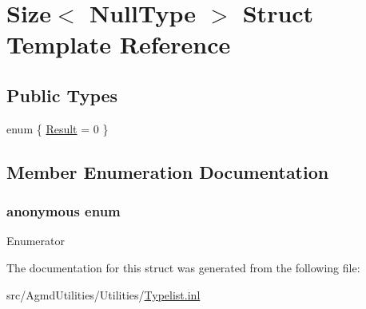 \hypertarget{struct_size_3_01_null_type_01_4}{\section{Size$<$ Null\+Type $>$ Struct Template Reference}
\label{struct_size_3_01_null_type_01_4}
}
\subsection*{Public Types}
\begin{DoxyCompactItemize}
\item 
enum \{ \hyperlink{struct_size_3_01_null_type_01_4_aeaa2268587cc37ed49ac6b9675227211a5bd5396c607e51f55bfcfcc2dc70995e}{Result} = 0
 \}
\end{DoxyCompactItemize}


\subsection{Member Enumeration Documentation}
\hypertarget{struct_size_3_01_null_type_01_4_aeaa2268587cc37ed49ac6b9675227211}{\subsubsection[{anonymous enum}]{\setlength{\rightskip}{0pt plus 5cm}anonymous enum}}\label{struct_size_3_01_null_type_01_4_aeaa2268587cc37ed49ac6b9675227211}
\begin{Desc}
\item[Enumerator]\par
\begin{description}
\item[{\em 
\hypertarget{struct_size_3_01_null_type_01_4_aeaa2268587cc37ed49ac6b9675227211a5bd5396c607e51f55bfcfcc2dc70995e}{Result}\label{struct_size_3_01_null_type_01_4_aeaa2268587cc37ed49ac6b9675227211a5bd5396c607e51f55bfcfcc2dc70995e}
}]\end{description}
\end{Desc}


The documentation for this struct was generated from the following file\+:\begin{DoxyCompactItemize}
\item 
src/\+Agmd\+Utilities/\+Utilities/\hyperlink{_typelist_8inl}{Typelist.\+inl}\end{DoxyCompactItemize}
